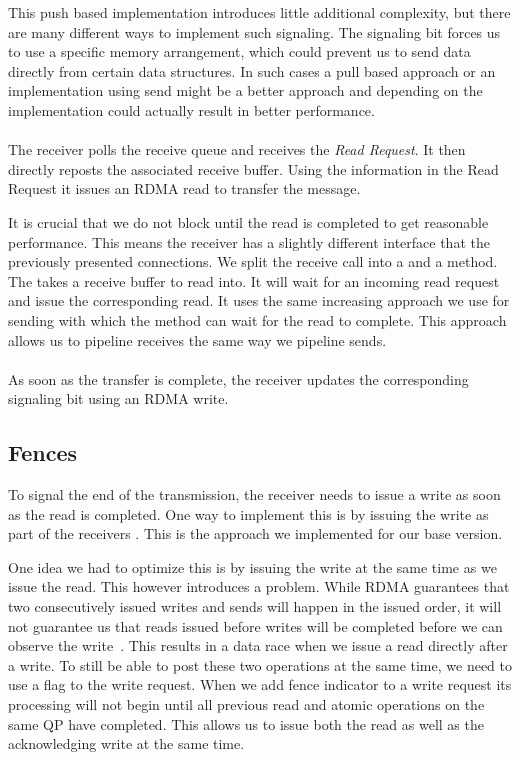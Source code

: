 This push based implementation introduces little additional complexity, but there are many different ways to implement such 
signaling. The signaling bit forces us to use a specific memory arrangement, which could prevent us to send data directly 
from certain data structures. In such cases a pull based approach or an implementation using send might be a better approach
and depending on the implementation could actually result in better performance.

\paragraph{} The receiver polls the receive queue and receives the \emph{Read Request}. It then directly reposts the associated 
receive buffer. Using the information in the Read Request it issues an RDMA read to transfer the message. 


It is crucial that we do not block until the read is completed to get reasonable performance.  This means the receiver has a
slightly different interface that the previously presented connections. We split the receive call into a 
 and a  method. The  takes a receive buffer
to read into. It will wait for an incoming read request and issue the corresponding read. It uses the same increasing 
 approach we use for sending with which the  method can wait for the read to complete. This approach
allows us to pipeline receives the same way we pipeline sends.

\paragraph{} As soon as the transfer is complete, the receiver updates the corresponding signaling bit using an RDMA write.

\subsection{Fences}

To signal the end of the transmission, the receiver needs to issue a write as soon as the read is completed. One way to 
implement this is by issuing the write as part of the receivers . This is the approach we implemented for our
base version.

One idea we had to optimize this is by issuing the write at the same time as we issue the read. This however introduces a 
problem. While RDMA guarantees that two consecutively issued writes and sends will happen in the issued order, 
it will not guarantee us that reads issued before writes will be completed before we can observe the write~\cite{}.
This results in a data race when we issue a read directly after a write. To still be able to post these two operations 
at the same time, we need to use a  flag to the write request. When we add fence indicator to a write
request its processing will not begin until all previous read and atomic operations on the same QP  have completed. This 
allows us to issue both the read as well as the acknowledging write at the same time.

